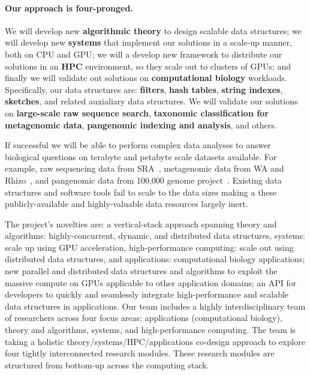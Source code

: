 \paragraph{Our approach is four-pronged.}  We will develop new \textbf{algorithmic theory} to design scalable data structures; we will develop new \textbf{systems} that implement our solutions in a scale-up manner,  both on CPU and GPU; we will a develop new framework to distribute our solutions in an \textbf{HPC} environment, so they  scale out to clusters of GPUs; and finally we will validate out solutions on \textbf{computational biology} workloads.
%
Specifically, our data structures are: \textbf{filters}, \textbf{hash tables}, \textbf{string indexes}, \textbf{sketches}, and related auxialiary data structures.  We will validate our solutions on \textbf{large-scale raw sequence search}, \textbf{taxonomic classification for metagenomic data}, \textbf{pangenomic indexing and analysis}, and others.

If successful we will be able to perform complex data analyses to answer biological questions on terabyte and petabyte scale datasets available. For example, raw sequencing data from SRA~\cite{kodama2012sequence}, metagenomic data from WA and Rhizo~\cite{hofmeyr2020terabase}, and pangenomic data from 100,000 genome project~\cite{1002021100}. Existing data structures and software tools fail to scale to the data sizes making a these publicly-available and highly-valuable data resources largely inert.


The project’s novelties are: a vertical-stack approach spanning theory and algorithms: highly-concurrent, dynamic, and distributed data structures, systems: scale up using GPU acceleration, high-performance computing: scale out using distributed data structures, and applications: computational biology applications; new parallel and distributed data structures and algorithms to exploit the massive compute on GPUs applicable to other application domains; an API for developers to quickly and seamlessly integrate high-performance and scalable data structures in applications.
%
Our team includes a highly interdisciplinary team of researchers across four focus areas: applications (computational biology), theory and algorithms, systems, and high-performance computing. The team is taking a holistic theory/systems/HPC/applications co-design approach to explore four tightly interconnected research modules. These research modules are structured from bottom-up across the computing stack.



